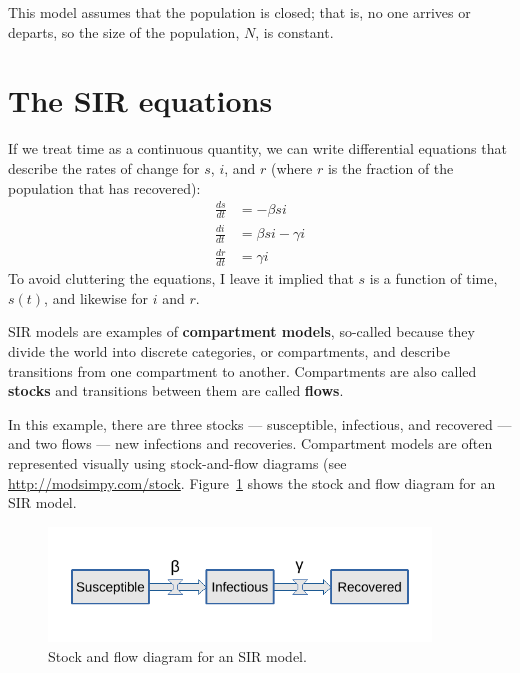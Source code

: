 \documentclass[12pt]{book}
\theoremstyle{exercise}
\begin{document}
This model assumes that the population is closed; that is, no one arrives or departs, so the size of the population, $N$, is constant.


\section{The SIR equations}
\label{sireqn}

If we treat time as a continuous quantity, we can write differential equations that describe the rates of change for $s$, $i$, and $r$ (where $r$ is the fraction of the population that has recovered):
%
\begin{align*}
\frac{ds}{dt} &= -\beta s i \\
\frac{di}{dt} &= \beta s i - \gamma i\\
\frac{dr}{dt} &= \gamma i
\end{align*}
%
To avoid cluttering the equations, I leave it implied that $s$ is a function of time, $s(t)$, and likewise for $i$ and $r$.

SIR models are examples of {\bf compartment models}, so-called because they divide the world into discrete categories, or compartments, and describe transitions from one compartment to another.  Compartments are also called {\bf stocks} and transitions between them are called {\bf flows}.

In this example, there are three stocks --- susceptible, infectious, and recovered --- and two flows --- new infections and recoveries.  Compartment models are often represented visually using stock-and-flow diagrams (see \url{http://modsimpy.com/stock}.
Figure~\ref{stock_flow1} shows the stock and flow diagram for an SIR model.

\begin{figure}
\centerline{\includegraphics[width=4in]{figs/stock_flow1.pdf}}
\caption{Stock and flow diagram for an SIR model.}
\label{stock_flow1}
\end{figure}
\end{document}
